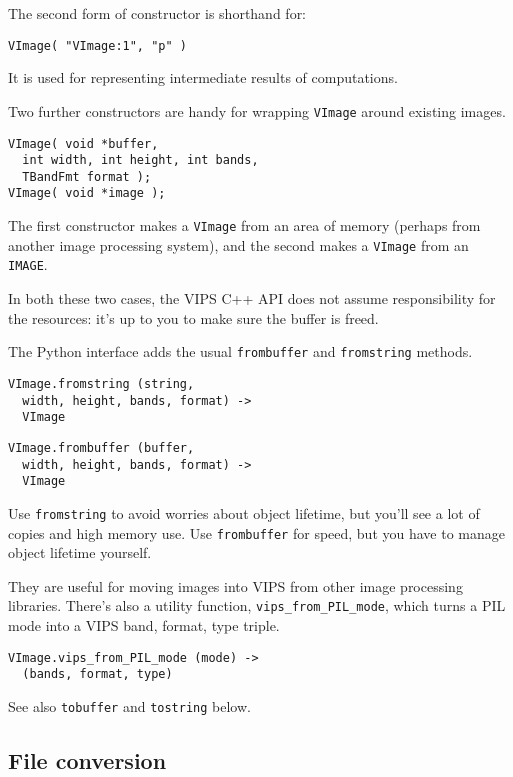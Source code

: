 The second form of constructor is shorthand for:

\begin{verbatim}
VImage( "VImage:1", "p" )
\end{verbatim}

\noindent
It is used for representing intermediate results of computations.

Two further constructors are handy for wrapping \verb+VImage+ around existing
images.

\begin{verbatim}
VImage( void *buffer, 
  int width, int height, int bands, 
  TBandFmt format );
VImage( void *image );
\end{verbatim}

\noindent
The first constructor makes a \verb+VImage+ from an area of memory (perhaps
from another image processing system), and the second makes a \verb+VImage+
from an \verb+IMAGE+. 

In both these two cases, the VIPS C++ API does not assume responsibility
for the resources: it's up to you to make sure the buffer is freed.

The Python interface adds the usual \verb+frombuffer+ and
\verb+fromstring+ methods. 

\begin{verbatim}
VImage.fromstring (string, 
  width, height, bands, format) -> 
  VImage
\end{verbatim}

\begin{verbatim}
VImage.frombuffer (buffer, 
  width, height, bands, format) -> 
  VImage
\end{verbatim}

\noindent
Use \verb+fromstring+ to avoid worries about object lifetime, but you'll see a
lot of copies and high memory use. Use \verb+frombuffer+ for speed, but you
have to manage object lifetime yourself.

They are useful for moving images into VIPS from other image processing
libraries. There's also a utility function, \verb+vips_from_PIL_mode+, which
turns a PIL mode into a VIPS band, format, type triple.

\begin{verbatim}
VImage.vips_from_PIL_mode (mode) -> 
  (bands, format, type) 
\end{verbatim}

See also \verb+tobuffer+ and \verb+tostring+ below.

\subsection{File conversion}

